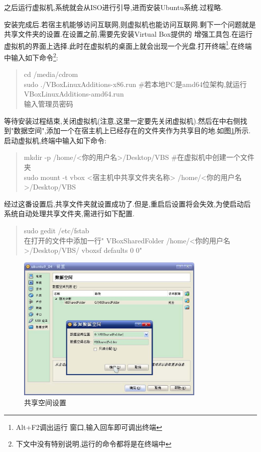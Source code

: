 \documentclass[12pt,a4paper,titlepage]{article}
\begin{document}
之后运行虚拟机,系统就会从ISO进行引导,进而安装Ubuntu系统.过程略.

安装完成后.若宿主机能够访问互联网,则虚拟机也能访问互联网.剩下一个问题就是共享文件夹的设置.在设置之前,需要先安装Virtual Box提供的
增强工具包.在运行虚拟机的界面上选择.此时在虚拟机的桌面上就会出现一个光盘.打开终端\footnote{Alt+F2调出运行
窗口,输入回车即可调出终端}.在终端中输入如下命令\footnote{下文中没有特别说明,运行的命令都将是在终端中}:
\begin{verse}
cd /media/cdrom\\sudo ./VBoxLinuxAdditions-x86.run \#若本地PC是amd64位架构,就运行VBoxLinuxAdditions-amd64.run\\输入管理员密码
\end{verse}
等待安装过程结束,关闭虚拟机{(注意,这里一定要先关闭虚拟机)}.然后在中右侧找到"数据空间",添加一个在宿主机上已经存在的文件夹作为共享目的地.如图\ref{f_sf}所示.
启动虚拟机,终端中输入如下命令:
\begin{verse}
mkdir -p /home/<你的用户名>/Desktop/VBS \#在虚拟机中创建一个文件夹\\sudo mount -t vbox <宿主机中共享文件夹名称> 
/home/<你的用户名>/Desktop/VBS
\end{verse}
经过这番设置后,共享文件夹就设置成功了.但是,重启后设置将会失效,为使启动后系统自动处理共享文件夹,需进行如下配置.
\begin{verse}\label{cmd0}
sudo gedit /etc/fstab\\在打开的文件中添加一行" VBoxSharedFolder  /home/<你的用户名>/Desktop/VBS/  vboxsf  defaults 0 0"
\end{verse}
\begin{figure}[!bthp]
\centering
\includegraphics[width=0.8\textwidth,scale=0.8]{pic/f_vb_setting_sf.eps}
\caption{共享空间设置\label{f_sf}}
\end{figure}
\end{document}
